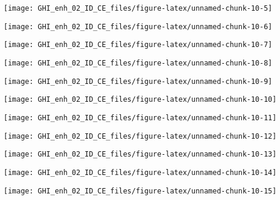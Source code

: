 \documentclass[
  10pt,
  a4paper,oneside]{article}
\begin{document}
\begin{center}\texttt{[image: GHI\_enh\_02\_ID\_CE\_files/figure-latex/unnamed-chunk-10-5]} \end{center}

\begin{center}\texttt{[image: GHI\_enh\_02\_ID\_CE\_files/figure-latex/unnamed-chunk-10-6]} \end{center}

\begin{center}\texttt{[image: GHI\_enh\_02\_ID\_CE\_files/figure-latex/unnamed-chunk-10-7]} \end{center}

\begin{center}\texttt{[image: GHI\_enh\_02\_ID\_CE\_files/figure-latex/unnamed-chunk-10-8]} \end{center}

\begin{center}\texttt{[image: GHI\_enh\_02\_ID\_CE\_files/figure-latex/unnamed-chunk-10-9]} \end{center}

\begin{center}\texttt{[image: GHI\_enh\_02\_ID\_CE\_files/figure-latex/unnamed-chunk-10-10]} \end{center}

\begin{center}\texttt{[image: GHI\_enh\_02\_ID\_CE\_files/figure-latex/unnamed-chunk-10-11]} \end{center}

\begin{center}\texttt{[image: GHI\_enh\_02\_ID\_CE\_files/figure-latex/unnamed-chunk-10-12]} \end{center}

\begin{center}\texttt{[image: GHI\_enh\_02\_ID\_CE\_files/figure-latex/unnamed-chunk-10-13]} \end{center}

\begin{center}\texttt{[image: GHI\_enh\_02\_ID\_CE\_files/figure-latex/unnamed-chunk-10-14]} \end{center}

\begin{center}\texttt{[image: GHI\_enh\_02\_ID\_CE\_files/figure-latex/unnamed-chunk-10-15]} \end{center}
\end{document}
